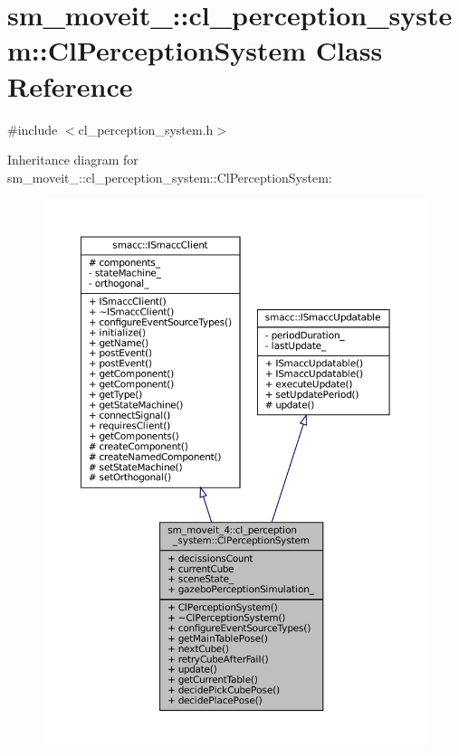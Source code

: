 \hypertarget{classsm__moveit__4_1_1cl__perception__system_1_1ClPerceptionSystem}{}\section{sm\+\_\+moveit\+\_\+:\+:cl\+\_\+perception\+\_\+system\+:\+:Cl\+Perception\+System Class Reference}
\label{classsm__moveit__4_1_1cl__perception__system_1_1ClPerceptionSystem}


{\ttfamily \#include $<$cl\+\_\+perception\+\_\+system.\+h$>$}



Inheritance diagram for sm\+\_\+moveit\+\_\+:\+:cl\+\_\+perception\+\_\+system\+:\+:Cl\+Perception\+System\+:
\nopagebreak
\begin{figure}[H]
\begin{center}
\leavevmode
\includegraphics[width=350pt]{classsm__moveit__4_1_1cl__perception__system_1_1ClPerceptionSystem__inherit__graph}
\end{center}
\end{figure}



